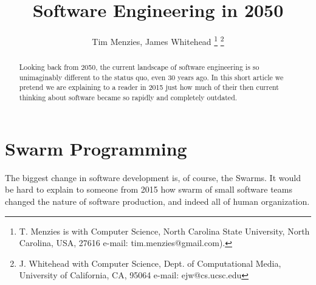 \documentclass[journal]{IEEEtran}
\begin{document}
 
\title{Software Engineering in 2050}%
\author{Tim Menzies, James Whitehead%
\thanks{T. Menzies is with Computer Science,
North Carolina State University, North Carolina, USA, 27616 e-mail: tim.menzies@gmail.com).}%
\thanks{J. Whitehead with Computer Science, Dept. of Computational Media,
University of California, CA, 95064 e-mail: ejw@cs.ucsc.edu}}%
 
\maketitle

\begin{abstract}
  Looking back from 2050, the current landscape of
software engineering is so unimaginably different to
the status quo, even 30 years ago.  In this short article we pretend we are
explaining to a reader in 2015 just how much of
their then current thinking about software 
became so rapidly and completely outdated.
\end{abstract}



\section{Swarm Programming}

The biggest change in software development is, of
course, the Swarms. It would be hard to explain to
someone from 2015 how swarm of small software teams
changed the nature of software production, and
indeed all of human organization.
\end{document}

